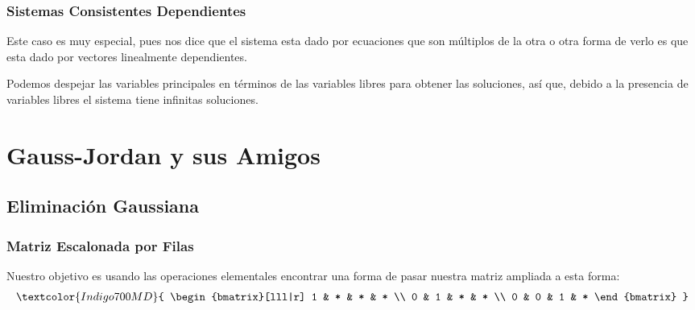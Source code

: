 \documentclass[12pt, fleqn]{report}                             %
\theoremstyle{break}                                            %
\begin{document}
            \subsection{Sistemas Consistentes Dependientes}

                Este caso es muy especial, pues nos dice que el sistema esta
                dado por ecuaciones que son múltiplos de la otra o otra forma
                de verlo es que esta dado por vectores linealmente dependientes.

                Podemos despejar las variables principales en términos de las variables
                libres para obtener las soluciones, así que, debido a la presencia
                de variables libres el sistema tiene infinitas soluciones.




    \clearpage
    \chapter{Gauss-Jordan y sus Amigos}



        \clearpage
        \section{Eliminación Gaussiana}


            \subsection{Matriz Escalonada por Filas}

                Nuestro objetivo es usando las operaciones elementales encontrar una
                forma de pasar nuestra matriz ampliada a esta forma:
                \begin{align*}
                    \textcolor{Indigo700MD}{
                        \begin{bmatrix}[lll|r]
                            1 & * & * & * \\
                            0 & 1 & * & * \\
                            0 & 0 & 1 & * 
                        \end{bmatrix}
                    }
                \end{align*}
\end{document}
